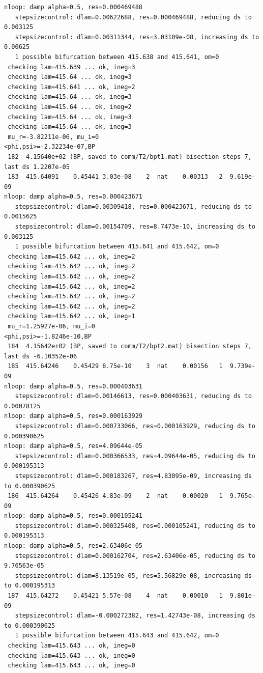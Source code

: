 \documentclass[a4paper,12pt]{article}
\begin{document}
\begin{verbatim}
nloop: damp alpha=0.5, res=0.000469488
   stepsizecontrol: dlam=0.00622688, res=0.000469488, reducing ds to 0.003125
   stepsizecontrol: dlam=0.00311344, res=3.03109e-08, increasing ds to 0.00625
   1 possible bifurcation between 415.638 and 415.641, om=0
 checking lam=415.639 ... ok, ineg=3
 checking lam=415.64 ... ok, ineg=3
 checking lam=415.641 ... ok, ineg=2
 checking lam=415.64 ... ok, ineg=3
 checking lam=415.64 ... ok, ineg=2
 checking lam=415.64 ... ok, ineg=3
 checking lam=415.64 ... ok, ineg=3
 mu_r=-3.82211e-06, mu_i=0 
<phi,psi>=-2.32234e-07,BP
 182  4.15640e+02 (BP, saved to comm/T2/bpt1.mat) bisection steps 7, last ds 1.2207e-05
 183  415.64091    0.45441 3.03e-08    2  nat    0.00313   2  9.619e-09 
nloop: damp alpha=0.5, res=0.000423671
   stepsizecontrol: dlam=0.00309418, res=0.000423671, reducing ds to 0.0015625
   stepsizecontrol: dlam=0.00154709, res=8.7473e-10, increasing ds to 0.003125
   1 possible bifurcation between 415.641 and 415.642, om=0
 checking lam=415.642 ... ok, ineg=2
 checking lam=415.642 ... ok, ineg=2
 checking lam=415.642 ... ok, ineg=2
 checking lam=415.642 ... ok, ineg=2
 checking lam=415.642 ... ok, ineg=2
 checking lam=415.642 ... ok, ineg=2
 checking lam=415.642 ... ok, ineg=1
 mu_r=1.25927e-06, mu_i=0 
<phi,psi>=-1.8246e-10,BP
 184  4.15642e+02 (BP, saved to comm/T2/bpt2.mat) bisection steps 7, last ds -6.10352e-06
 185  415.64246    0.45429 8.75e-10    3  nat    0.00156   1  9.739e-09 
nloop: damp alpha=0.5, res=0.000403631
   stepsizecontrol: dlam=0.00146613, res=0.000403631, reducing ds to 0.00078125
nloop: damp alpha=0.5, res=0.000163929
   stepsizecontrol: dlam=0.000733066, res=0.000163929, reducing ds to 0.000390625
nloop: damp alpha=0.5, res=4.09644e-05
   stepsizecontrol: dlam=0.000366533, res=4.09644e-05, reducing ds to 0.000195313
   stepsizecontrol: dlam=0.000183267, res=4.83095e-09, increasing ds to 0.000390625
 186  415.64264    0.45426 4.83e-09    2  nat    0.00020   1  9.765e-09 
nloop: damp alpha=0.5, res=0.000105241
   stepsizecontrol: dlam=0.000325408, res=0.000105241, reducing ds to 0.000195313
nloop: damp alpha=0.5, res=2.63406e-05
   stepsizecontrol: dlam=0.000162704, res=2.63406e-05, reducing ds to 9.76563e-05
   stepsizecontrol: dlam=8.13519e-05, res=5.56829e-08, increasing ds to 0.000195313
 187  415.64272    0.45421 5.57e-08    4  nat    0.00010   1  9.801e-09 
   stepsizecontrol: dlam=-0.000272382, res=1.42743e-08, increasing ds to 0.000390625
   1 possible bifurcation between 415.643 and 415.642, om=0
 checking lam=415.643 ... ok, ineg=0
 checking lam=415.643 ... ok, ineg=0
 checking lam=415.643 ... ok, ineg=0

\end{verbatim}
\end{document}
